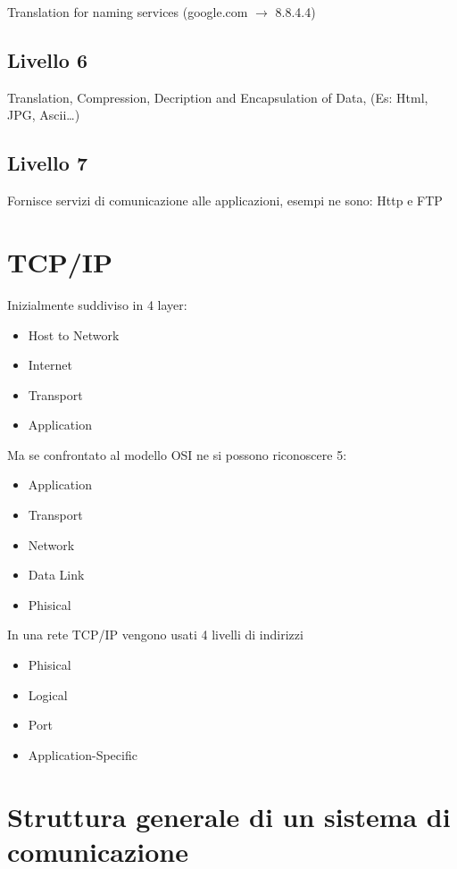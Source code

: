 \documentclass{article}
\begin{document}
Translation for naming services (google.com $\rightarrow$ 8.8.4.4)

\subsection{Livello 6}
Translation, Compression, Decription and Encapsulation of Data, (Es: Html, JPG, Ascii\ldots)

\subsection{Livello 7}
Fornisce servizi di comunicazione alle applicazioni, esempi ne sono: Http e FTP

\section{TCP/IP}
Inizialmente suddiviso in 4 layer:

\begin{itemize}
    \item Host to Network
    \item Internet
    \item Transport
    \item Application
\end{itemize}

Ma se confrontato al modello OSI ne si possono riconoscere 5:

\begin{itemize}
    \item Application
    \item Transport
    \item Network
    \item Data Link
    \item Phisical
\end{itemize}

In una rete TCP/IP vengono usati 4 livelli di indirizzi

\begin{itemize}
    \item Phisical
    \item Logical
    \item Port
    \item Application-Specific
\end{itemize}

\section{Struttura generale di un sistema di comunicazione}
\end{document}
